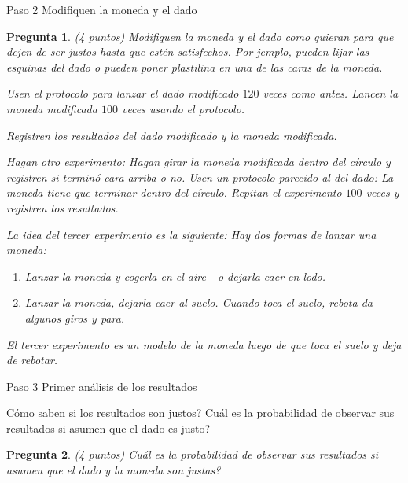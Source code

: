 \documentclass{article}
\newtheorem{pregunta}{Pregunta}
\begin{document}
\begin{topbot}
  \vspace{0.7em}
  Paso 2 \quad Modifiquen la moneda y el dado
  \vspace{0.7em}
\end{topbot}

\begin{pregunta} (4 puntos)
Modifiquen la moneda y el dado como quieran para que dejen de ser justos hasta que estén satisfechos. Por jemplo, pueden lijar las esquinas del dado o pueden poner plastilina en una de las caras de la moneda.
\par
Usen el protocolo para lanzar el dado modificado $120$ veces como antes. Lancen la moneda modificada $100$ veces usando el protocolo.
\par
Registren los resultados del dado modificado y la moneda modificada.

Hagan otro experimento: Hagan girar la moneda modificada dentro del círculo y registren si terminó cara arriba o no. Usen un protocolo parecido al del dado: La moneda tiene que terminar dentro del círculo. Repitan el experimento $100$ veces y registren los resultados.

La idea del tercer experimento es la siguiente: Hay dos formas de lanzar una moneda:

\begin{enumerate}
  \item Lanzar la moneda y cogerla en el aire - o dejarla caer en lodo.
  \item Lanzar la moneda, dejarla caer al suelo. Cuando toca el suelo, rebota da algunos giros y para.
\end{enumerate}

El tercer experimento es un modelo de la moneda luego de que toca el suelo y deja de rebotar.

\end{pregunta}

\begin{topbot}
  \vspace{0.7em}
  Paso 3 \quad Primer análisis de los resultados
  \vspace{0.7em}
\end{topbot}

Cómo saben si los resultados son justos? Cuál es la probabilidad de observar sus resultados si asumen que el dado es justo?

\begin{pregunta} (4 puntos)
Cuál es la probabilidad de observar sus resultados si asumen que el dado y la moneda son justas?
\end{pregunta}
\end{document}
